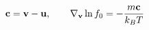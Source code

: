 \documentclass[preview]{standalone}
\begin{document}
\begin{align*}
\special{dvisvgm:raw <g id='unique000'>}\va c=\va v-\va u,\qquad \nabla_{\va v}\ln f_0=-\frac{m\va c}{k_BT}\special{dvisvgm:raw </g>}
\end{align*}
\end{document}
